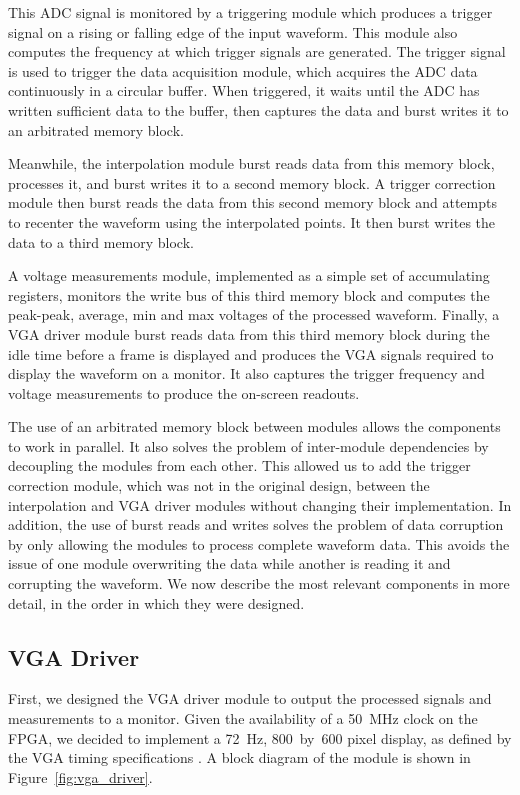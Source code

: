\documentclass[journal,hidelinks]{IEEEtran}
\begin{document}
This ADC signal is monitored by a triggering module which produces a trigger signal on a rising or falling edge of the input waveform. This module also computes the frequency at which trigger signals are generated. The trigger signal is used to trigger the data acquisition module, which acquires the ADC data continuously in a circular buffer. When triggered, it waits until the ADC has written sufficient data to the buffer, then captures the data and burst writes it to an arbitrated memory block.

Meanwhile, the interpolation module burst reads data from this memory block, processes it, and burst writes it to a second memory block. A trigger correction module then burst reads the data from this second memory block and attempts to recenter the waveform using the interpolated points. It then burst writes the data to a third memory block.

A voltage measurements module, implemented as a simple set of accumulating registers, monitors the write bus of this third memory block and computes the peak-peak, average, min and max voltages of the processed waveform. Finally, a VGA driver module burst reads data from this third memory block during the idle time before a frame is displayed and produces the VGA signals required to display the waveform on a monitor. It also captures the trigger frequency and voltage measurements to produce the on-screen readouts.

The use of an arbitrated memory block between modules allows the components to work in parallel. It also solves the problem of inter-module dependencies by decoupling the modules from each other. This allowed us to add the trigger correction module, which was not in the original design, between the interpolation and VGA driver modules without changing their implementation. In addition, the use of burst reads and writes solves the problem of data corruption by only allowing the modules to process complete waveform data. This avoids the issue of one module overwriting the data while another is reading it and corrupting the waveform. We now describe the most relevant components in more detail, in the order in which they were designed.

\subsection{VGA Driver}

First, we designed the VGA driver module to output the processed signals and measurements to a monitor. Given the availability of a 50~MHz clock on the FPGA, we decided to implement a 72~Hz, 800~by~600 pixel display, as defined by the VGA timing specifications \cite{vga_timing}. A block diagram of the module is shown in Figure~\ref{fig:vga_driver}.
\end{document}
